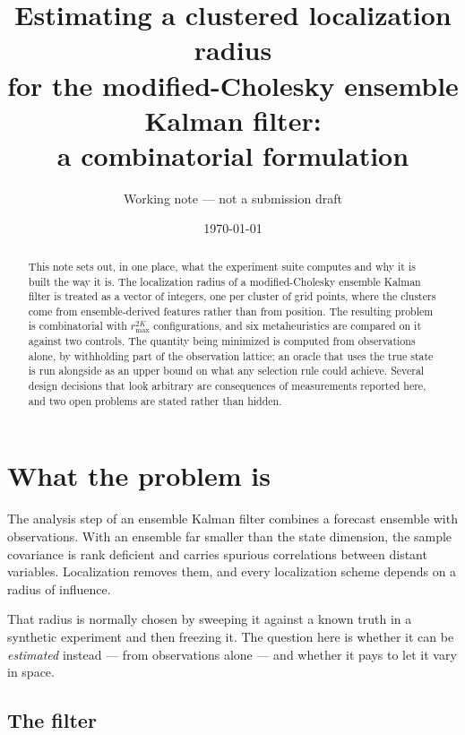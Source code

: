 \documentclass[11pt,a4paper]{article}
\title{\textbf{Estimating a clustered localization radius\\
for the modified-Cholesky ensemble Kalman filter:\\
a combinatorial formulation}}
\author{Working note --- not a submission draft}
\date{\today}
\theoremstyle{definition}
\begin{document}
\maketitle

\begin{abstract}
\noindent
This note sets out, in one place, what the experiment suite computes and why it
is built the way it is. The localization radius of a modified-Cholesky ensemble
Kalman filter is treated as a vector of integers, one per cluster of grid
points, where the clusters come from ensemble-derived features rather than from
position. The resulting problem is combinatorial with $r_{\max}^{2K}$
configurations, and six metaheuristics are compared on it against two controls.
The quantity being minimized is computed from observations alone, by
withholding part of the observation lattice; an oracle that uses the true state
is run alongside as an upper bound on what any selection rule could achieve.
Several design decisions that look arbitrary are consequences of measurements
reported here, and two open problems are stated rather than hidden.
\end{abstract}

\section{What the problem is}

The analysis step of an ensemble Kalman filter combines a forecast ensemble
with observations. With an ensemble far smaller than the state dimension, the
sample covariance is rank deficient and carries spurious correlations between
distant variables. Localization removes them, and every localization scheme
depends on a radius of influence.

That radius is normally chosen by sweeping it against a known truth in a
synthetic experiment and then freezing it. The question here is whether it can
be \emph{estimated} instead --- from observations alone --- and whether it pays
to let it vary in space.

\subsection{The filter}
\end{document}
